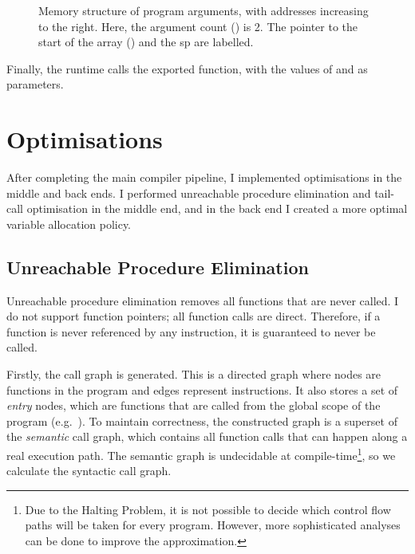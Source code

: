 \documentclass[00-main.tex]{subfiles}
\begin{document}
\begin{figure}[t]
  \centering
  \caption{\protect{}%
    Memory structure of program arguments, with addresses increasing to the right. Here, the argument count () is 2.
    The pointer to the start of the array () and the \gls{sp} are labelled.
  }%
  \label{fig:program args memory structure}
\end{figure}

Finally, the runtime calls the exported  function, with the values of  and  as parameters.

\section{Optimisations}\label{sec:impl:optimisations}

After completing the main compiler pipeline, I implemented optimisations in the middle and back ends.
I performed unreachable procedure elimination and tail-call optimisation in the middle end, and in the back end I created a more optimal variable allocation policy.

\subsection{Unreachable Procedure Elimination}\label{sec:impl:unreachable procedure elimination}

Unreachable procedure elimination removes all functions that are never called.
I do not support function pointers; all function calls are direct.
Therefore, if a function is never referenced by any  instruction, it is guaranteed to never be called.

Firstly, the call graph is generated.
This is a directed graph where nodes are functions in the program and edges represent  instructions.
It also stores a set of \emph{entry} nodes, which are functions that are called from the global scope of the program (e.g.~). %
To maintain correctness, the constructed graph is a superset of the \emph{semantic} call graph, which contains all function calls that can happen along a real execution path.
The semantic graph is undecidable at compile-time\footnote{Due to the Halting Problem, it is not possible to decide which control flow paths will be taken for every program. However, more sophisticated analyses can be done to improve the approximation.}, so we calculate the syntactic call graph.
\end{document}
